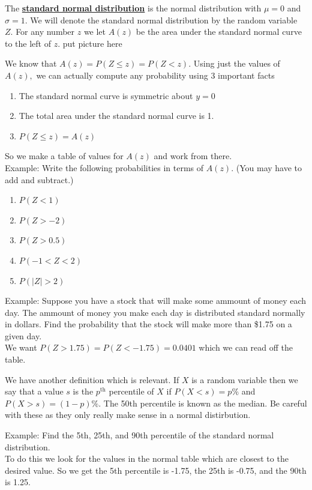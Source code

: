 \documentclass[14,fleqn]{article}
\newcommand{\defn}[1]{\textbf{\underline{#1}}}
\begin{document}
The \defn{standard normal distribution} is the normal distribution with $\mu=0$ and $\sigma=1.$ We will denote the standard normal distribution by the random variable $Z.$ For any number $z$ we let $A(z)$ be the area under the standard normal curve to the left of $z.$ \Large put picture here \normalsize

We know that $A(z)=P(Z\le z)=P(Z<z).$ Using just the values of $A(z),$ we can actually compute any probability using 3 important facts
\begin{enumerate}
	\item The standard normal curve is symmetric about $y=0$
	\item The total area under the standard normal curve is 1.
	\item $P(Z\le z)=A(z)$
\end{enumerate}
So we make a table of values for $A(z)$ and work from there.\\
Example: Write the following probabilities in terms of $A(z).$ (You may have to add and subtract.)
\begin{enumerate}
	\item $P(Z<1)$
	\item $P(Z>-2)$
	\item $P(Z>0.5)$
	\item $P(-1<Z<2)$
	\item $P(|Z|>2)$
\end{enumerate}

Example: Suppose you have a stock that will make some ammount of money each day. The ammount of money you make each day is distributed standard normally in dollars. Find the probability that the stock will make more than \$1.75 on a given day.\\
We want $P(Z>1.75)=P(Z<-1.75)=0.0401$ which we can read off the table.

We have another definition which is relevant. If $X$ is a random variable then we say that a value $s$ is the $p^\text{th}$ percentile of $X$ if $P(X<s)=p\%$ and $P(X>s)=(1-p)\%.$ The 50th percentile is known as the median. Be careful with these as they only really make sense in a normal distirbution.

Example: Find the 5th, 25th, and 90th percentile of the standard normal distribution.\\
To do this we look for the values in the normal table which are closest to the desired value. So we get the 5th percentile is -1.75, the 25th is -0.75, and the 90th is 1.25.
\end{document}
